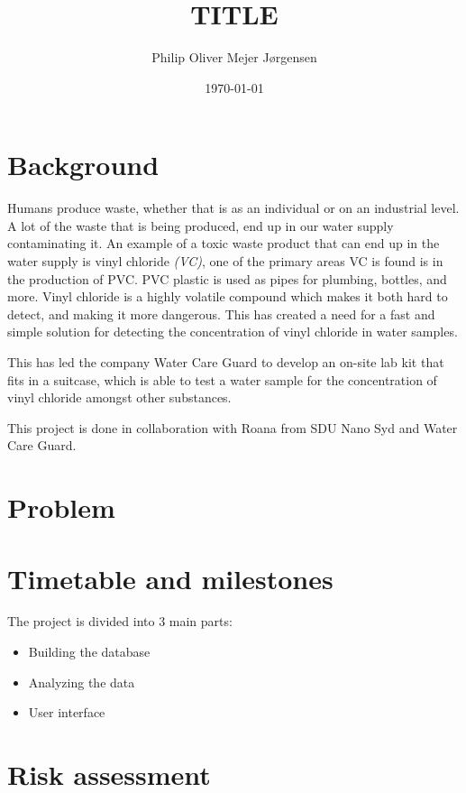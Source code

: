 \documentclass{article}
\title{TITLE}
\author{Philip Oliver Mejer Jørgensen}
\date{\today}
\begin{document}
\maketitle

\section{Background}
Humans produce waste, whether that is as an individual or on an industrial level. A lot of the waste that is being produced, end up in our water supply contaminating it.
An example of a toxic waste product that can end up in the water supply is vinyl chloride \textit{(VC)}, one of the primary areas VC is found is in the production of PVC.
PVC plastic is used as pipes for plumbing, bottles, and more\cite{pvc_applications}.
Vinyl chloride is a highly volatile compound which makes it both hard to detect, and making it more dangerous.
This has created a need for a fast and simple solution for detecting the concentration of vinyl chloride in water samples.

This has led the company Water Care Guard to develop an on-site lab kit that fits in a suitcase, which is able to test a water sample for the concentration of vinyl chloride amongst other substances.

This project is done in collaboration with Roana from SDU Nano Syd and Water Care Guard.

\section{Problem}

\section{Timetable and milestones}
The project is divided into 3 main parts:\\
\begin{itemize}
    \item Building the database
    \item Analyzing the data
    \item User interface
\end{itemize}

\section{Risk assessment}
\end{document}
